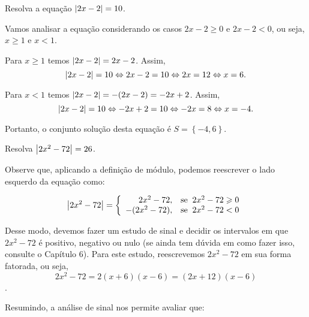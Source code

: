 \begin{exem}
 Resolva a equação $\left|2x-2\right|= 10$.

Vamos analisar a equação considerando os casos $2x - 2 \geq 0$ e $2x - 2 < 0$, ou seja, $x \geq 1$ e $x < 1$.

Para $x\geq 1$ temos $\left|2x-2\right| = 2x-2$. Assim, $$\left|2x-2\right| = 10 \Leftrightarrow 2x - 2 = 10 \Leftrightarrow 2x = 12 \Leftrightarrow x = 6.$$

Para $x < 1$ temos $\left|2x-2\right| = -(2x-2)= -2x+2$. Assim, $$\left|2x-2\right| = 10 \Leftrightarrow -2x + 2 = 10 \Leftrightarrow -2x = 8 \Leftrightarrow x = -4.$$

Portanto, o conjunto solução desta equação é $S= \left\{-4, 6 \right\}$.
 \end{exem}
 
 \begin{exem}
 Resolva $\left|2x^2 - 72\right|= 26$.

Observe que, aplicando a definição de módulo, podemos reescrever o lado esquerdo da equação como:

\begin{equation}
\label{ex:mod_quadratico}
\left|2x^2 - 72\right| = \left\{\begin{array}{rl}
2x^2 - 72, & \mbox{se} \; \;  2x^2 - 72 \geqslant 0\\
-(2x^2 - 72), & \mbox{se} \; \; 2x^2 - 72 < 0
\end{array}\right. \end{equation}

Desse modo, devemos fazer um estudo de sinal e decidir os intervalos em que $2x^2 - 72$ é positivo, negativo ou nulo (se ainda tem dúvida em como fazer isso, consulte o Capítulo 6). Para este estudo, reescrevemos $2x^2 - 72$ em sua forma fatorada, ou seja, $$2x^2 - 72 = 2(x+6)(x-6) = (2x+ 12)(x-6)$$.

\begin{signtbl}{3}{2}
\end{signtbl}

Resumindo, a análise de sinal nos permite avaliar que:


\end{exem}
